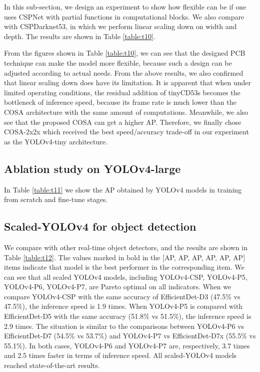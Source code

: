 \documentclass[10pt,twocolumn,letterpaper]{article}
\begin{document}
In this sub-section, we design an experiment to show how flexible can be if one uses CSPNet with partial functions in computational blocks.  We also compare with CSPDarknet53, in which we perform linear scaling down on width and depth.  The results are shown in Table \ref{table:t10}.

From the figures shown in Table \ref{table:t10}, we can see that the designed PCB technique can make the model more flexible, because such a design can be adjusted according to actual needs.  From the above results, we also confirmed that linear scaling down does have its limitation.  It is apparent that when under limited operating conditions, the residual addition of tinyCD53s becomes the bottleneck of inference speed, because its frame rate is much lower than the COSA architecture with the same amount of computations.  Meanwhile, we also see that the proposed COSA can get a higher AP.  Therefore, we finally chose COSA-2x2x which received the best speed/accuracy trade-off in our experiment as the YOLOv4-tiny architecture.

\subsection{Ablation study on YOLOv4-large}

In Table \ref{table:t11} we show the AP obtained by YOLOv4 models in training from scratch and fine-tune stages. 

\subsection{Scaled-YOLOv4 for object detection}

We compare with other real-time object detectors, and the results are shown in Table \ref{table:t12}.  The values marked in bold in the [AP, AP, AP, AP, AP, AP] items indicate that model is the best performer in the corresponding item.  We can see that all scaled YOLOv4 models, including YOLOv4-CSP, YOLOv4-P5, YOLOv4-P6, YOLOv4-P7, are Pareto optimal on all indicators.  When we compare YOLOv4-CSP with the same accuracy of EfficientDet-D3 (47.5\% vs 47.5\%), the inference speed is 1.9 times.  When YOLOv4-P5 is compared with EfficientDet-D5 with the same accuracy (51.8\% vs 51.5\%), the inference speed is 2.9 times.  The situation is similar to the comparisons between YOLOv4-P6 vs EfficientDet-D7 (54.5\% vs 53.7\%) and YOLOv4-P7 vs EfficientDet-D7x (55.5\% vs 55.1\%).  In both cases, YOLOv4-P6 and YOLOv4-P7 are, respectively, 3.7 times and 2.5 times faster in terms of inference speed.  All scaled-YOLOv4 models reached state-of-the-art results.
\end{document}
